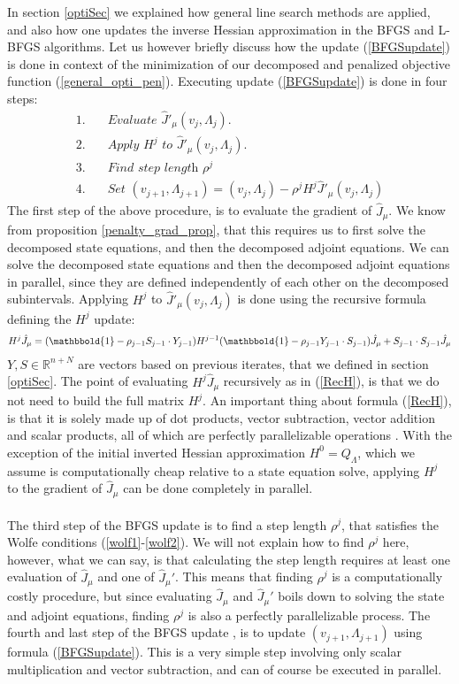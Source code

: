 In section \ref{optiSec} we explained how general line search methods are applied, and also how one updates the inverse Hessian approximation in the BFGS and L-BFGS algorithms. Let us however briefly discuss how the update (\ref{BFGSupdate}) is done in context of the  minimization of our decomposed and penalized objective function (\ref{general_opti_pen}). Executing update (\ref{BFGSupdate}) is done in four steps:
\begin{align*}
1.\quad&\textit{Evaluate $\hat J'_{\mu}(v_j,\Lambda_j)$.} \\
2.\quad&\textit{Apply $H^j$ to $\hat J'_{\mu}(v_j,\Lambda_j)$.}\\
3.\quad&\textit{Find step length $\rho^j$} \\
4.\quad&\textit{Set $(v_{j+1},\Lambda_{j+1}) = (v_j,\Lambda_j) - \rho^j H^j \hat J'_{\mu}(v_j,\Lambda_j)$} 
\end{align*}
The first step of the above procedure, is to evaluate the gradient of $\hat J_{\mu}$. We know from proposition \ref{penalty_grad_prop}, that this requires us to first solve the decomposed state equations, and then the decomposed adjoint equations. We can solve the decomposed state equations and then the decomposed adjoint equations in parallel, since they are defined independently of each other on the decomposed subintervals. Applying $H^j$ to $\hat J'_{\mu}(v_j,\Lambda_j)$ is done using the recursive formula defining the $H^j$ update:
\begin{align}
H^j \hat J_{\mu} = (\mathbbold{1}-\rho_{j-1}S_{j-1}\cdot Y_{j-1})H^{j-1}(\mathbbold{1} -\rho_{j-1}Y_{j-1}\cdot S_{j-1})\hat J_{\mu} + S_{j-1}\cdot S_{j-1}\hat J_{\mu} \label{RecH}
\end{align}
$Y,S\in\mathbb{R}^{n+N}$ are vectors based on previous iterates, that we defined in section \ref{optiSec}. The point of evaluating $H^j \hat J_{\mu}$ recursively as in (\ref{RecH}), is that we do not need to build the full matrix $H^j$. An important thing about formula (\ref{RecH}), is that it is solely made up of dot products, vector subtraction, vector addition and scalar products, all of which are perfectly parallelizable operations \cite{grama2003introduction}. With the exception of the initial inverted Hessian approximation $H^0=Q_{\Lambda}$, which we assume is computationally cheap relative to a state equation solve, applying $H^j$ to the gradient of $\hat J_{\mu}$ can be done completely in parallel. 
\\
\\
The third step of the BFGS update is to find a step length $\rho^j$, that satisfies the Wolfe conditions (\ref{wolf1}-\ref{wolf2}). We will not explain how to find $\rho^j$ here, however, what we can say, is that calculating the step length requires at least one evaluation of $\hat J_{\mu}$ and one of $\hat J_{\mu}'$. This means that finding $\rho^j$ is a computationally costly procedure, but since evaluating $\hat J_{\mu}$ and $\hat J_{\mu}'$ boils down to solving the state and adjoint equations, finding $\rho^j$ is also a perfectly parallelizable process. The fourth and last step of the BFGS update , is to update $(v_{j+1},\Lambda_{j+1})$ using formula (\ref{BFGSupdate}). This is a very simple step involving only scalar multiplication and vector subtraction, and can of course be executed in parallel.
